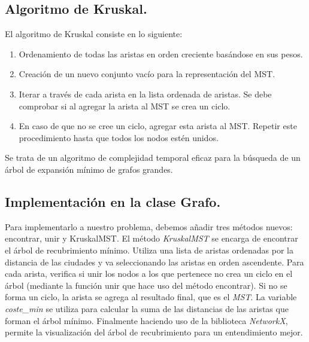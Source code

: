 \documentclass[12pt,oneside]{book}
\begin{document}
   \subsection{Algoritmo de Kruskal.}
El algoritmo de Kruskal consiste en lo siguiente:
\begin{enumerate}
    \item	Ordenamiento de todas las aristas en orden creciente basándose en sus pesos.
    \item	Creación de un nuevo conjunto vacío para la representación del MST.
    \item   Iterar a través de cada arista en la lista ordenada de aristas. Se debe comprobar si al agregar la arista al MST se crea un ciclo.
    \item	En caso de que no se cree un ciclo, agregar esta arista al MST. Repetir este procedimiento hasta que todos los nodos estén unidos.
\end{enumerate}

Se trata de un algoritmo de complejidad temporal eficaz para la búsqueda de un árbol de expansión mínimo de grafos grandes.
   \subsection{Implementación en la clase Grafo.}
Para implementarlo a nuestro problema, debemos añadir tres métodos nuevos: encontrar, unir y KruskalMST. El método \textit{KruskalMST} se encarga de encontrar el árbol de recubrimiento mínimo. Utiliza una lista de aristas ordenadas por la distancia de las ciudades y va seleccionando las aristas en orden ascendente. Para cada arista, verifica si unir los nodos a los que pertenece no crea un ciclo en el árbol (mediante la función unir que hace uso del método encontrar). Si no se forma un ciclo, la arista se agrega al resultado final, que es el \textit{MST}.
La variable \textit{coste\_min} se utiliza para calcular la suma de las distancias de las aristas que forman el árbol mínimo. Finalmente haciendo uso de la biblioteca \textit{NetworkX}, permite la visualización del árbol de recubrimiento para un entendimiento mejor. 
\end{document}
